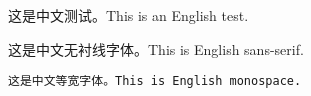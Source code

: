 \documentclass{article}
\begin{document}
这是中文测试。This is an English test.

\textsf{这是中文无衬线字体。This is English sans-serif.}

\texttt{这是中文等宽字体。This is English monospace.}
\end{document}
